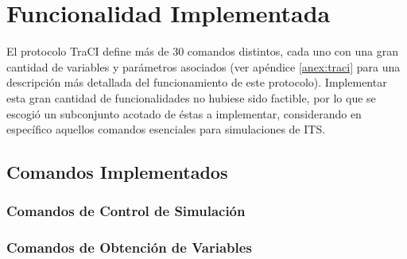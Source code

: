 \section{Funcionalidad Implementada}

El protocolo TraCI define más de 30 comandos distintos, cada uno con una gran cantidad de variables y parámetros asociados (ver apéndice \ref{anex:traci} para una descripción más detallada del funcionamiento de este protocolo). Implementar esta gran cantidad de funcionalidades no hubiese sido factible, por lo que se escogió un subconjunto acotado de éstas a implementar, considerando en específico aquellos comandos esenciales para simulaciones de ITS.

\subsection{Comandos Implementados} \label{sec:comandos}

\subsubsection{Comandos de Control de Simulación}

\begin{itemize}
    \begin{multicols}{2}
    \end{multicols}
\end{itemize}

\subsubsection{Comandos de Obtención de Variables}

